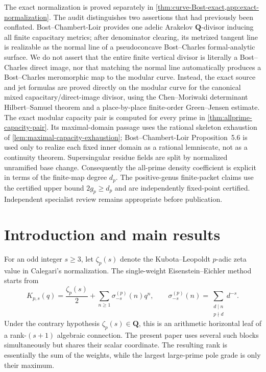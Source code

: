 \documentclass[11pt]{article}
\theoremstyle{definition}
\theoremstyle{remark}
\newcommand{\Q}{\mathbf Q}
\begin{document}
The exact normalization is proved separately in
\cref{thm:curve-Bost-exact,app:exact-normalization}.  The audit distinguishes
two assertions that had previously been conflated.  Bost--Chambert-Loir
provides one adelic Arakelov $\Q$-divisor inducing all finite capacitary
metrics; after denominator clearing, its metrized tangent line is realizable
as the normal line of a pseudoconcave Bost--Charles formal-analytic surface.
We do not assert that the entire finite vertical divisor is literally a
Bost--Charles direct image, nor that matching the normal line automatically
produces a Bost--Charles meromorphic map to the modular curve.  Instead, the
exact source and jet formulas are proved directly on the modular curve for the
canonical mixed capacitary/direct-image divisor, using the Chen--Moriwaki
determinant Hilbert--Samuel theorem and a place-by-place finite-order
Green--Jensen estimate.  The exact modular capacity pair is computed for every prime in
\cref{thm:allprime-capacity-pair}.  Its maximal-domain passage uses the
rational skeleton exhaustion of \cref{lem:maximal-capacity-exhaustion};
Bost--Chambert-Loir Proposition~5.6 is used only to realize each fixed inner
domain as a rational lemniscate, not as a continuity theorem.  Supersingular
residue fields are split by normalized unramified base change.  Consequently
the all-prime density coefficient is explicit in terms of the finite-map
degree $d_p$.  The positive-genus finite-packet claims use the certified upper
bound $2g_p\ge d_p$ and are independently fixed-point certified.  Independent
specialist review remains appropriate before publication.
\tableofcontents

\section{Introduction and main results}\label{sec:intro}

For an odd integer $s\ge3$, let $\zeta_p(s)$ denote the Kubota--Leopoldt
$p$-adic zeta value in Calegari's normalization.  The single-weight
Eisenstein--Eichler method starts from
\[
 K_{p,s}(q)=\frac{\zeta_p(s)}2+
 \sum_{n\ge1}\sigma_{-s}^{(p)}(n)q^n,
 \qquad
 \sigma_{-s}^{(p)}(n)=\sum_{\substack{d\mid n\\p\nmid d}}d^{-s}.
\]
Under the contrary hypothesis $\zeta_p(s)\in\Q$, this is an arithmetic
horizontal leaf of a rank-$(s+1)$ algebraic connection.  The present paper
uses several such blocks simultaneously but shares their scalar coordinate.
The resulting rank is essentially the sum of the weights, while the largest
large-prime pole grade is only their maximum.
\end{document}
